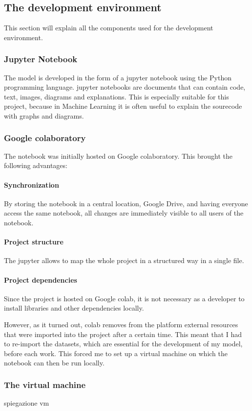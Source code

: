 \subsection{The development environment}
This section will explain all the components used for the development environment. 
\subsubsection{Jupyter Notebook}
The model is developed in the form of a \gls{jupyter} notebook using the Python programming language. \gls{jupyter} notebooks are documents that can contain code, text, images, diagrams and explanations. This is especially suitable for this project, because in Machine Learning it is often useful to explain the sourecode with graphs and diagrams.

\subsubsection{Google \gls{colab}oratory}
The notebook was initially hosted on Google \gls{colab}oratory\cite{colab}. This brought the following advantages:
\paragraph{Synchronization} 
By storing the notebook in a central location, Google Drive, and having everyone access the same notebook, all changes are immediately visible to all users of the notebook.
\paragraph{Project structure} 
The \gls{jupyter} allows to map the whole project in a structured way in a single file. 
\paragraph{Project dependencies}
Since the project is hosted on Google \gls{colab}, it is not necessary as a developer to install libraries and other dependencies locally.

However, as it turned out, \gls{colab} removes from the platform external resources that were imported into the project after a certain time. This meant that I had to re-import the datasets, which are essential for the development of my model, before each work. This forced me to set up a \gls{virtual machine} on which the notebook can then be run locally.

\subsubsection{The \gls{virtual machine}}
spiegazione vm

